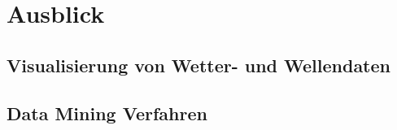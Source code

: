 \chapter{Ausblick}

\section{Visualisierung von Wetter- und Wellendaten}

\section{Data Mining Verfahren}

